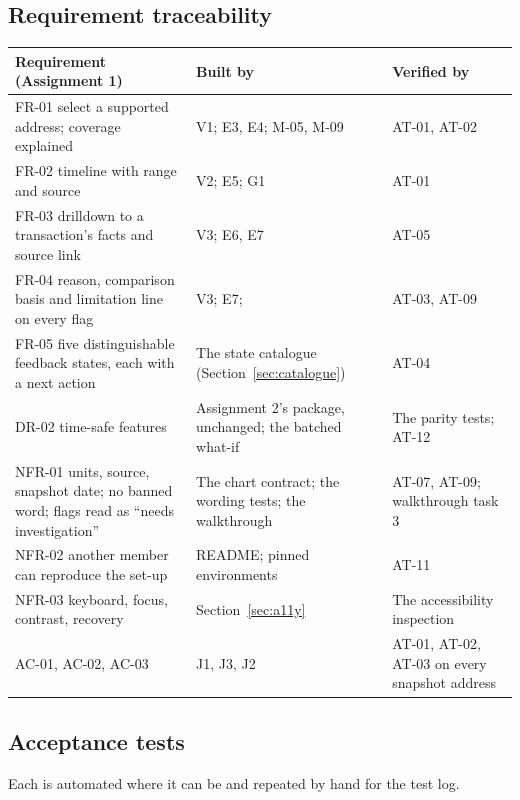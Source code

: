 \subsection{Requirement traceability}
\label{sec:trace}

{\small
\begin{longtable}{@{}L{4.4cm}L{4.3cm}L{5.4cm}@{}}
\toprule
\textbf{Requirement (Assignment 1)} & \textbf{Built by} & \textbf{Verified by} \\
\midrule
\endhead
FR-01 select a supported address; coverage explained & V1; E3, E4; M-05, M-09 & AT-01, AT-02 \\
FR-02 timeline with range and source & V2; E5; G1 & AT-01 \\
FR-03 drilldown to a transaction's facts and source link & V3; E6, E7 & AT-05 \\
FR-04 reason, comparison basis and limitation line on every flag & V3; E7;  & AT-03, AT-09 \\
FR-05 five distinguishable feedback states, each with a next action & The state catalogue (Section~\ref{sec:catalogue}) & AT-04 \\
DR-02 time-safe features & Assignment 2's package, unchanged; the batched what-if & The parity tests; AT-12 \\
NFR-01 units, source, snapshot date; no banned word; flags read as ``needs investigation'' & The chart contract; the wording tests; the walkthrough & AT-07, AT-09; walkthrough task 3 \\
NFR-02 another member can reproduce the set-up & README; pinned environments & AT-11 \\
NFR-03 keyboard, focus, contrast, recovery & Section~\ref{sec:a11y} & The accessibility inspection \\
AC-01, AC-02, AC-03 & J1, J3, J2 & AT-01, AT-02, AT-03 on every snapshot address \\
\bottomrule
\end{longtable}
}

\subsection{Acceptance tests}
\label{sec:acceptance}

Each is automated where it can be and repeated by hand for the test log.

